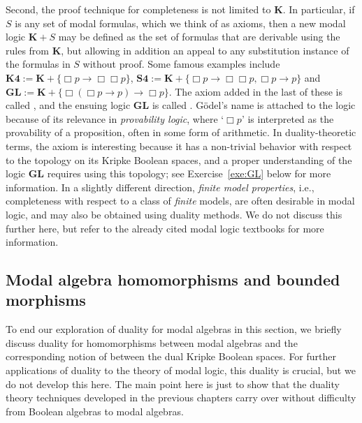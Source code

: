 Second, the proof technique for completeness is not limited to $\mathbf{K}$. In particular, if $S$ is any set of modal formulas, which we think of as axioms, then a new modal logic $\mathbf{K} + S$ may be defined as the set of formulas that are derivable using the rules from $\mathbf{K}$, but allowing in addition an appeal to any substitution instance of the formulas in $S$ without proof. Some famous examples include $\mathbf{K4} := \mathbf{K} + \{ \Box p \to \Box \Box p\}$, $\mathbf{S4} := \mathbf{K} +  \{ \Box p \to \Box \Box p, \Box p \to p\}$ and $\mathbf{GL} := \mathbf{K} + \{\Box (\Box p \to p) \to \Box p\}$. The axiom added in the last of these is called , and the ensuing logic $\mathbf{GL}$ is called . Gödel's name is attached to the logic because of its relevance in \emph{provability logic}, where `$\Box p$' is interpreted as the provability of a proposition, often in some form of arithmetic. In duality-theoretic terms, the axiom is interesting because it has a non-trivial behavior with respect to the topology on its Kripke Boolean spaces, and a proper understanding of the logic $\mathbf{GL}$ requires using this topology; see Exercise~\ref{exe:GL} below for more information. In a slightly different direction, \emph{finite model properties}, i.e., completeness with respect to a class of \emph{finite} models, are often desirable in modal logic, and may also be obtained using duality methods. We do not discuss this further here, but refer to the already cited modal logic textbooks \cite{BRV2001,ChaZak1997} for more information.

\subsection*{Modal algebra homomorphisms and bounded morphisms}
To end our exploration of duality for modal algebras in this section, we briefly discuss duality for homomorphisms between modal algebras and the corresponding notion of  between the dual Kripke Boolean spaces. For further applications of duality to the theory of modal logic, this duality is crucial, but we do not develop this here. The main point here is just to show that the duality theory techniques developed in the previous chapters carry over without difficulty from Boolean algebras to modal algebras.

